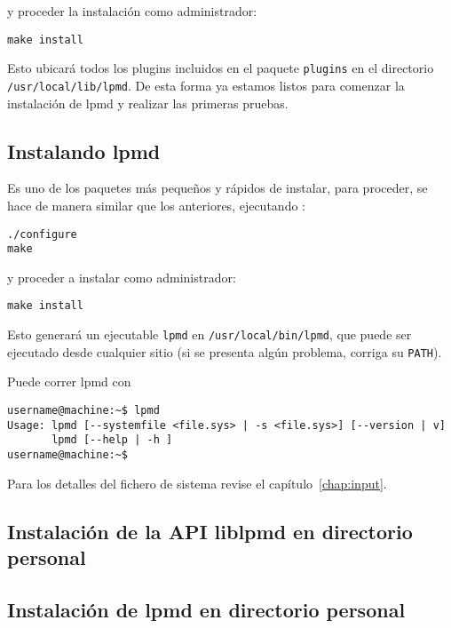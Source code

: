 \documentclass[a4paper,10pt]{scrbook}
\newcommand{\control}[1]{\begin{center}\begin{minipage}{10cm}\texttt{#1}\end{minipage}\end{center}}
\begin{document}
y proceder la instalaci\'on como administrador:

\control{make install}

Esto ubicar\'a todos los plugins incluidos en el paquete \verb|plugins| en el directorio \verb|/usr/local/lib/lpmd|. De esta forma ya estamos listos para comenzar la instalaci\'on de lpmd y realizar las primeras pruebas.

\subsection{Instalando lpmd}

Es uno de los paquetes m\'as peque\~nos y r\'apidos de instalar, para proceder, se hace de manera similar que los anteriores, ejecutando :

\control{./configure \\ make}

y proceder a instalar como administrador:

\control{make install}

Esto generar\'a un ejecutable \verb|lpmd| en \verb|/usr/local/bin/lpmd|, que puede ser ejecutado desde cualquier sitio (si se presenta alg\'un problema, corriga su \verb|PATH|).

Puede correr lpmd con

\begin{verbatim}
username@machine:~$ lpmd
Usage: lpmd [--systemfile <file.sys> | -s <file.sys>] [--version | v]
       lpmd [--help | -h ]
username@machine:~$
\end{verbatim}

Para los detalles del fichero de sistema revise el cap\'itulo~\ref{chap:input}.

\subsection{Instalaci\'on de la API liblpmd en directorio personal}

\subsection{Instalaci\'on de lpmd en directorio personal}
\end{document}
